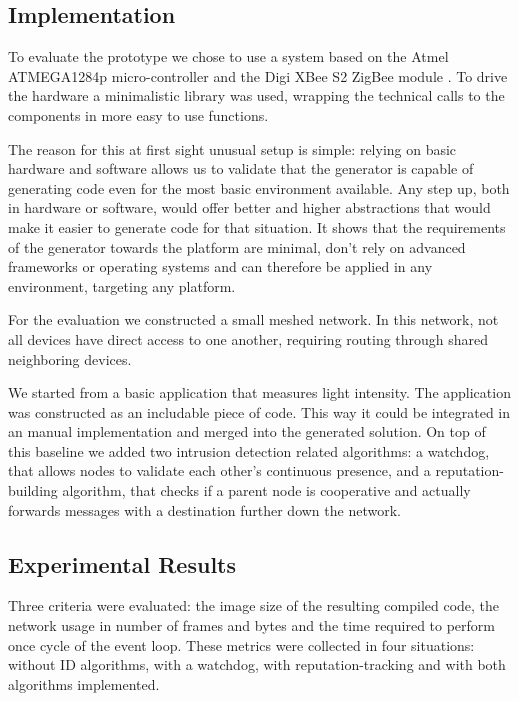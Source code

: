 \documentclass[conference]{IEEEtran}
\begin{document}
\subsection{Implementation}

To evaluate the prototype we chose to use a system based on the Atmel
ATMEGA1284p micro-controller \cite{datasheet:atmega1284p} and the Digi XBee S2
ZigBee module \cite{manual:xbee}. To drive the hardware a minimalistic library
was used, wrapping the technical calls to the components in more easy to use
functions.

The reason for this at first sight unusual setup is simple: relying on basic
hardware and software allows us to validate that the generator is capable of
generating code even for the most basic environment available. Any step up,
both in hardware or software, would offer better and higher abstractions that
would make it easier to generate code for that situation. It shows that the
requirements of the generator towards the platform are minimal, don't rely on
advanced frameworks or operating systems and can therefore be applied in any
environment, targeting any platform.

For the evaluation we constructed a small meshed network. In this network, not
all devices have direct access to one another, requiring routing through shared
neighboring devices.

We started from a basic application that measures light intensity. The
application was constructed as an includable piece of code. This way it could
be integrated in an manual implementation and merged into the generated
solution. On top of this baseline we added two intrusion detection related
algorithms: a watchdog\cite{mishra2004intrusion}, that allows nodes to validate
each other's continuous presence, and a reputation-building
algorithm\cite{ganeriwal2008reputation}, that checks if a parent node is
cooperative and actually forwards messages with a destination further down the
network.

\subsection{Experimental Results}

Three criteria were evaluated: the image size of the resulting compiled code,
the network usage in number of frames and bytes and the time required to
perform once cycle of the event loop. These metrics were collected in four
situations: without ID algorithms, with a watchdog, with reputation-tracking
and with both algorithms implemented.
\end{document}
